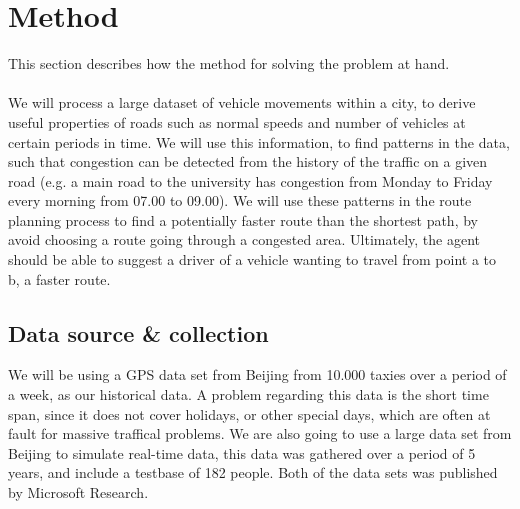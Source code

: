 \section{Method}
This section describes how the method for solving the problem at hand.
\\\\
We will process a large dataset of vehicle movements within a city, to derive useful properties of roads such as normal speeds and number of vehicles at certain periods in time. We will use this information, to find patterns in the data, such that congestion can be detected from the history of the traffic on a given road (e.g. a main road to the university has congestion from Monday to Friday every morning from 07.00 to 09.00). We will use these patterns in the route planning process to find a potentially faster route than the shortest path, by avoid choosing a route going through a congested area. Ultimately, the agent should be able to suggest a driver of a vehicle wanting to travel from point a to b, a faster route.

\subsection*{Data source \& collection}
We will be using a GPS data set from Beijing from 10.000 taxies over a period of a week, as our historical data\cite{Tdrive}. A problem regarding this data is the short time span, since it does not cover holidays, or other special days, which are often at fault for massive traffical problems. We are also going to use a large data set from Beijing to simulate real-time data, this data was gathered over a period of 5 years, and include a testbase of 182 people\cite{Geolife}. Both of the data sets was published by Microsoft Research.

